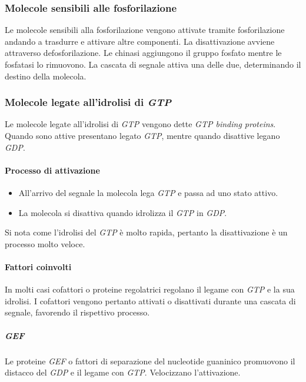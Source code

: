 		\subsubsection{Molecole sensibili alle fosforilazione}
		Le molecole sensibili alla fosforilazione vengono attivate tramite fosforilazione andando a trasdurre e attivare altre componenti.
		La disattivazione avviene attraverso defosforilazione.
		Le chinasi aggiungono il gruppo fosfato mentre le fosfatasi lo rimuovono.
		La cascata di segnale attiva una delle due, determinando il destino della molecola.

		\subsubsection{Molecole legate all'idrolisi di \emph{GTP}}
		Le molecole legate all'idrolisi di \emph{GTP} vengono dette \emph{GTP binding proteins}.
		Quando sono attive presentano legato \emph{GTP}, mentre quando disattive legano \emph{GDP}.

			\paragraph{Processo di attivazione}
			\begin{multicols}{2}
				\begin{itemize}
					\item All'arrivo del segnale la molecola lega \emph{GTP} e passa ad uno stato attivo.
					\item La molecola si disattiva quando idrolizza il \emph{GTP} in \emph{GDP}.
				\end{itemize}
			\end{multicols}
			Si nota come l'idrolisi del \emph{GTP} \`e molto rapida, pertanto la disattivazione \`e un processo molto veloce.

			\paragraph{Fattori coinvolti}
			In molti casi cofattori o proteine regolatrici regolano il legame con \emph{GTP} e la sua idrolisi.
			I cofattori vengono pertanto attivati o disattivati durante una cascata di segnale, favorendo il rispettivo processo.
				
				\subparagraph{\emph{GEF}}
				Le proteine \emph{GEF} o fattori di separazione del nucleotide guaninico promuovono il distacco del \emph{GDP} e il legame con \emph{GTP}.
				Velocizzano l'attivazione.

